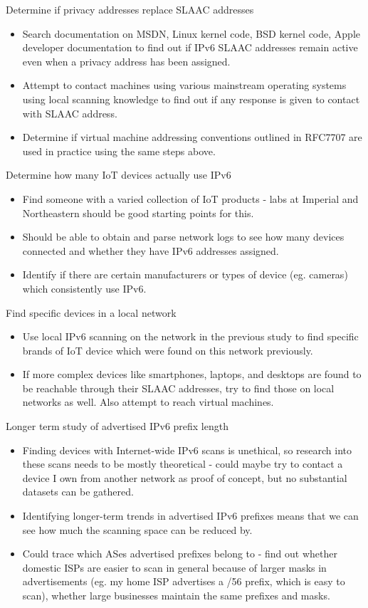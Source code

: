 \documentclass[10pt,sigconf]{acmart}
\begin{document}
Determine if privacy addresses replace SLAAC addresses
\begin{itemize}
	\item Search documentation on MSDN, Linux kernel code, BSD kernel code, Apple developer documentation to find out if IPv6 SLAAC addresses remain active even when a privacy address has been assigned.
	\item Attempt to contact machines using various mainstream operating systems using local scanning knowledge to find out if any response is given to contact with SLAAC address.
	\item Determine if virtual machine addressing conventions outlined in RFC7707 are used in practice using the same steps above.
\end{itemize}

Determine how many IoT devices actually use IPv6
\begin{itemize}
	\item Find someone with a varied collection of IoT products - labs at Imperial and Northeastern should be good starting points for this.
	\item Should be able to obtain and parse network logs to see how many devices connected and whether they have IPv6 addresses assigned.
	\item Identify if there are certain manufacturers or types of device (eg. cameras) which consistently use IPv6.
\end{itemize}

Find specific devices in a local network
\begin{itemize}
	\item Use local IPv6 scanning on the network in the previous study to find specific brands of IoT device which were found on this network previously.
	\item If more complex devices like smartphones, laptops, and desktops are found to be reachable through their SLAAC addresses, try to find those on local networks as well. Also attempt to reach virtual machines.
\end{itemize}

Longer term study of advertised IPv6 prefix length
\begin{itemize}
	\item Finding devices with Internet-wide IPv6 scans is unethical, so research into these scans needs to be mostly theoretical - could maybe try to contact a device I own from another network as proof of concept, but no substantial datasets can be gathered.
	\item Identifying longer-term trends in advertised IPv6 prefixes means that we can see how much the scanning space can be reduced by.
	\item Could trace which ASes advertised prefixes belong to - find out whether domestic ISPs are easier to scan in general because of larger masks in advertisements (eg. my home ISP advertises a /56 prefix, which is easy to scan), whether large businesses maintain the same prefixes and masks.
\end{itemize}
\end{document}
